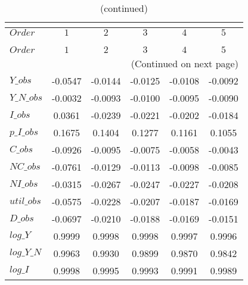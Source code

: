  
\begin{center}
\begin{longtable}{lccccc} 
\caption{COEFFICIENTS OF AUTOCORRELATION}\\
 \label{Table:th_autocorr_matrix}\\
\toprule 
$Order      $	 & 	 $          1$	 & 	 $          2$	 & 	 $          3$	 & 	 $          4$	 & 	 $          5$\\
\midrule \endfirsthead 
\caption{(continued)}\\
 \toprule \\ 
$Order      $	 & 	 $          1$	 & 	 $          2$	 & 	 $          3$	 & 	 $          4$	 & 	 $          5$\\
\midrule \endhead 
\midrule \multicolumn{6}{r}{(Continued on next page)} \\ \bottomrule \endfoot 
\bottomrule \endlastfoot 
$Y\_obs     $	 & 	    -0.0547	 & 	    -0.0144	 & 	    -0.0125	 & 	    -0.0108	 & 	    -0.0092 \\ 
$Y\_N\_obs  $	 & 	    -0.0032	 & 	    -0.0093	 & 	    -0.0100	 & 	    -0.0095	 & 	    -0.0090 \\ 
$I\_obs     $	 & 	     0.0361	 & 	    -0.0239	 & 	    -0.0221	 & 	    -0.0202	 & 	    -0.0184 \\ 
$p\_I\_obs  $	 & 	     0.1675	 & 	     0.1404	 & 	     0.1277	 & 	     0.1161	 & 	     0.1055 \\ 
$C\_obs     $	 & 	    -0.0926	 & 	    -0.0095	 & 	    -0.0075	 & 	    -0.0058	 & 	    -0.0043 \\ 
$NC\_obs    $	 & 	    -0.0761	 & 	    -0.0129	 & 	    -0.0113	 & 	    -0.0098	 & 	    -0.0085 \\ 
$NI\_obs    $	 & 	    -0.0315	 & 	    -0.0267	 & 	    -0.0247	 & 	    -0.0227	 & 	    -0.0208 \\ 
$util\_obs  $	 & 	    -0.0575	 & 	    -0.0228	 & 	    -0.0207	 & 	    -0.0187	 & 	    -0.0169 \\ 
$D\_obs     $	 & 	    -0.0697	 & 	    -0.0210	 & 	    -0.0188	 & 	    -0.0169	 & 	    -0.0151 \\ 
$log\_Y     $	 & 	     0.9999	 & 	     0.9998	 & 	     0.9998	 & 	     0.9997	 & 	     0.9996 \\ 
$log\_Y\_N  $	 & 	     0.9963	 & 	     0.9930	 & 	     0.9899	 & 	     0.9870	 & 	     0.9842 \\ 
$log\_I     $	 & 	     0.9998	 & 	     0.9995	 & 	     0.9993	 & 	     0.9991	 & 	     0.9989 \\ 

\end{longtable}
\end{center}
